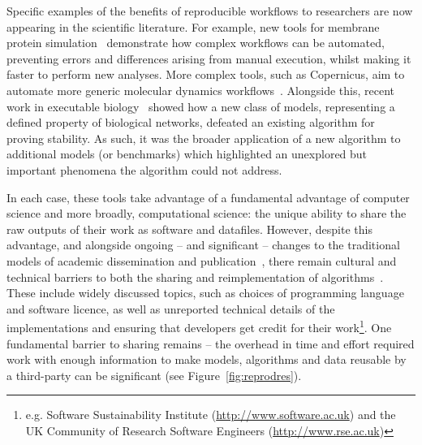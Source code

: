 \documentclass[conference]{IEEEtran}
\begin{document}
Specific examples of the benefits of reproducible workflows to
researchers are now appearing in the scientific literature. For
example, new tools for membrane protein
simulation~\cite{Stansfeld,Hall2014} demonstrate how complex workflows
can be automated, preventing errors and differences arising from
manual execution, whilst making it faster to perform new
analyses. More complex tools, such as Copernicus, aim to automate more
generic molecular dynamics workflows~\cite{Pronk}. Alongside this,
recent work in executable biology~\cite{Cook} showed how a new class
of models, representing a defined property of biological networks,
defeated an existing algorithm for proving stability. As such, it was
the broader application of a new algorithm to additional models (or
benchmarks) which highlighted an unexplored but important phenomena
the algorithm could not address.

In each case, these tools take advantage of a fundamental advantage of
computer science and more broadly, computational science: the unique
ability to share the raw outputs of their work as software and
datafiles. However, despite this advantage, and alongside ongoing --
and significant -- changes to the traditional models of academic
dissemination and
publication~\cite{deroure:2010,stodden-et-al:2013,fursin+dubach:2014},
there remain cultural and technical barriers to both the sharing and
reimplementation of algorithms~\cite{crick-et-al_wssspe2}. These
include widely discussed topics, such as choices of programming
language and software licence, as well as unreported technical details
of the implementations and ensuring that developers get credit for
their work\footnote{e.g. Software Sustainability Institute
(\url{http://www.software.ac.uk}) and the UK Community of Research
Software Engineers (\url{http://www.rse.ac.uk})}. One fundamental
barrier to sharing remains -- the overhead in time and effort required
work with enough information to make models, algorithms and data
reusable by a third-party can be significant (see
Figure~\ref{fig:reprodres}).

\end{document}
